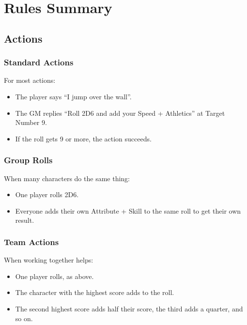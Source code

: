 \section*{Rules Summary}

\begin{multicols}{2}

\subsection{Actions}

\subsubsection{Standard Actions}

For most actions:

\begin{itemize}

	\item{The player says ``I jump over the wall''.}
	\item{The GM replies ``Roll 2D6 and add your Speed + Athletics'' at Target Number 9.}
	\item{If the roll gets 9 or more, the action succeeds.}

\end{itemize}

\subsubsection{Group Rolls}

When many characters do the same thing:

\begin{itemize}

	\item{One player rolls 2D6.}
	\item{Everyone adds their own Attribute + Skill to the same roll to get their own result.}

\end{itemize}

\subsubsection{Team Actions}

When working together helps:

\begin{itemize}

	\item{One player rolls, as above.}
	\item{The character with the highest score adds to the roll.}
	\item{The second highest score adds half their score, the third adds a quarter, and so on.}


\end{itemize}
\end{multicols}
